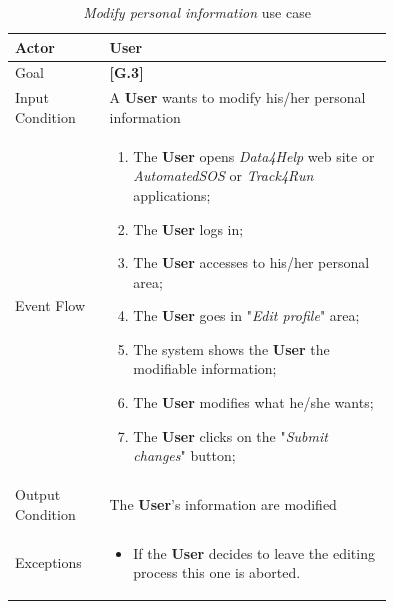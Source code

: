 \begin{center}
\begin{table}[H]
\begin{tabular}{ | l | p{0.75\linewidth} | }
  \hline
    Actor & \textbf{User} \\ \hline
    Goal & \textbf{[G.3]} \\ \hline
    Input Condition & A \textbf{User} wants to modify his/her personal information\\ \hline
    Event Flow & \begin{minipage}[t]{0.7\textwidth}
      \begin{enumerate}
        \item The \textbf{User} opens \textit{Data4Help} web site or \textit{AutomatedSOS} or \textit{Track4Run} applications;
        \item The \textbf{User} logs in;
        \item The \textbf{User} accesses to his/her personal area;
        \item The \textbf{User} goes in "\textit{Edit profile}" area;
        \item The system shows the \textbf{User} the modifiable information;
        \item The \textbf{User} modifies what he/she wants;
        \item The \textbf{User} clicks on the "\textit{Submit changes}" button;
      \end{enumerate}
    \smallskip
  \end{minipage} \\ \hline
  Output Condition & The \textbf{User}'s information are modified\\ \hline
  Exceptions & \begin{minipage}[t]{0.7\textwidth}
    \begin{itemize}
      \smallskip
      \item If the \textbf{User} decides to leave the editing process this one is aborted.
    \end{itemize}
    \smallskip
  \end{minipage}  \\ \hline
\end{tabular}
\caption{\textit{Modify personal information} use case}
\label{table:modifyPersonalInformationTable}
\end{table}
\end{center}

